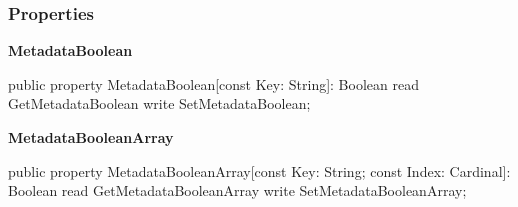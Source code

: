 \documentclass{report}
\newif\ifpdf
\begin{document}
\subsubsection*{\large{\textbf{Properties}}\normalsize\hspace{1ex}\hfill}
\begin{list}{}{
\setlength{\itemindent}{0cm}
\setlength{\listparindent}{0cm}
\setlength{\leftmargin}{\evensidemargin}
\addtolength{\leftmargin}{\tmplength}
\settowidth{\labelsep}{X}
\addtolength{\leftmargin}{\labelsep}
\setlength{\labelwidth}{\tmplength}
}
\label{ok_array_property.TAbstractNode-MetadataBoolean}
\item[\textbf{MetadataBoolean}\hfill]
\ifpdf
\begin{flushleft}
\fi
\begin{ttfamily}
public property MetadataBoolean[const Key: String]: Boolean read GetMetadataBoolean write SetMetadataBoolean;\end{ttfamily}

\ifpdf
\end{flushleft}
\fi


\par  \label{ok_array_property.TAbstractNode-MetadataBooleanArray}
\item[\textbf{MetadataBooleanArray}\hfill]
\ifpdf
\begin{flushleft}
\fi
\begin{ttfamily}
public property MetadataBooleanArray[const Key: String; const Index: Cardinal]: Boolean read GetMetadataBooleanArray write SetMetadataBooleanArray;\end{ttfamily}

\ifpdf
\end{flushleft}
\fi


\par  \end{list}
\end{document}
